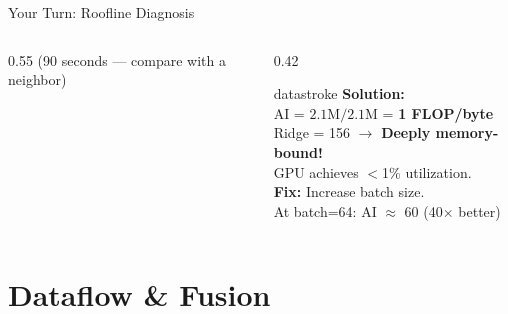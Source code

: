 \documentclass[aspectratio=169, 12pt]{beamer}
\begin{document}
\begin{frame}{Your Turn: Roofline Diagnosis}
\begin{columns}[T]
\begin{column}{0.55\textwidth}
    {\scriptsize\textcolor{midgray}{(90 seconds --- compare with a neighbor)}}
  \end{column}
  \begin{column}{0.42\textwidth}
    \pause
    \begin{mlsyscard}{datastroke}
    {\scriptsize \textbf{Solution:}\\[0.05cm]
    AI = $2.1\text{M}/2.1\text{M}$ = \textbf{1 FLOP/byte}\\[0.05cm]
    Ridge = 156 $\to$ \textcolor{errorstroke}{\textbf{Deeply memory-bound!}}\\[0.05cm]
    GPU achieves $<$1\% utilization.\\[0.05cm]
    \textbf{Fix:} Increase batch size.\\
    At batch=64: AI $\approx$ 60 (40$\times$ better)
    }
    \end{mlsyscard}
  \end{column}
\end{columns}

\end{frame}

\section{Dataflow \& Fusion}
\end{document}
